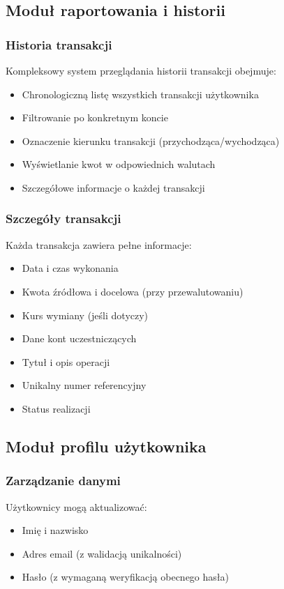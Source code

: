 \documentclass[12pt,a4paper]{article}
\begin{document}
    \subsection{Moduł raportowania i historii}

    \subsubsection{Historia transakcji}
    Kompleksowy system przeglądania historii transakcji obejmuje:
    \begin{itemize}
        \item Chronologiczną listę wszystkich transakcji użytkownika
        \item Filtrowanie po konkretnym koncie
        \item Oznaczenie kierunku transakcji (przychodząca/wychodząca)
        \item Wyświetlanie kwot w odpowiednich walutach
        \item Szczegółowe informacje o każdej transakcji
    \end{itemize}

    \subsubsection{Szczegóły transakcji}
    Każda transakcja zawiera pełne informacje:
    \begin{itemize}
        \item Data i czas wykonania
        \item Kwota źródłowa i docelowa (przy przewalutowaniu)
        \item Kurs wymiany (jeśli dotyczy)
        \item Dane kont uczestniczących
        \item Tytuł i opis operacji
        \item Unikalny numer referencyjny
        \item Status realizacji
    \end{itemize}

    \subsection{Moduł profilu użytkownika}

    \subsubsection{Zarządzanie danymi}
    Użytkownicy mogą aktualizować:
    \begin{itemize}
        \item Imię i nazwisko
        \item Adres email (z walidacją unikalności)
        \item Hasło (z wymaganą weryfikacją obecnego hasła)
    \end{itemize}
\end{document}
